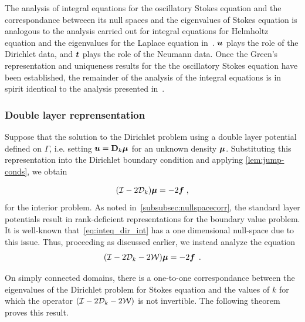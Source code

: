 \begin{remark}
The analysis of integral equations for the oscillatory Stokes
equation and the correspondance betweeen its null spaces and the eigenvalues
of Stokes equation is analogous to the analysis carried out
for integral equations for Helmholtz equation and the eigenvalues
for the Laplace equation in~\cite{zhao2015robust}.
${\boldsymbol u}$ plays the role of the Dirichlet data, and ${\boldsymbol t}$ plays the role
of the Neumann data. 
Once the Green's representation and uniqueness results for the 
the oscillatory Stokes equation have been established,
the remainder of the analysis of the integral equations
is in spirit identical to the analysis presented in~\cite{zhao2015robust}.
\end{remark}

\subsubsection{Double layer reprensentation}
\label{subsec:dlanalysis}
Suppose that the solution to the Dirichlet problem using
a double layer potential defined on $\Gamma$, i.e.
setting ${\boldsymbol u} = {\bf D}_{k} {\boldsymbol \mu}$ for
an unknown density ${\boldsymbol \mu}$. 
Substituting this representation
into the Dirichlet boundary condition and applying
\cref{lem:jump-conds}, we obtain

\begin{equation}
  (\mathcal I - 2{\mathcal D}_{k}) {\boldsymbol \mu} = -2{\boldsymbol f} \; , \label{eq:inteq_dir_int}
\end{equation}
for the interior problem.
As noted in~\cref{subsubsec:nullspacecorr}, the standard layer potentials
result in rank-deficient representations for the boundary value problem.
It is well-known that~\cref{eq:inteq_dir_int} has a one dimensional
null-space due to this issue. Thus, proceeding as discussed earlier,
we instead analyze the equation
\begin{equation}
(\mathcal I - 2{\mathcal D}_{k}  -2{\mathcal W}) {\boldsymbol \mu} = -2{\boldsymbol f} \; \, . \label{eq:inteq_dir_int_mod}
\end{equation}

On simply connected domains, there is a one-to-one correspondance between
the eigenvalues of the Dirichlet problem for Stokes equation
and the values of $k$ for which the operator $(\mathcal I - 2{\mathcal D}_{k} - 2{\mathcal W})$
is not invertible. 
The following theorem proves this result.

